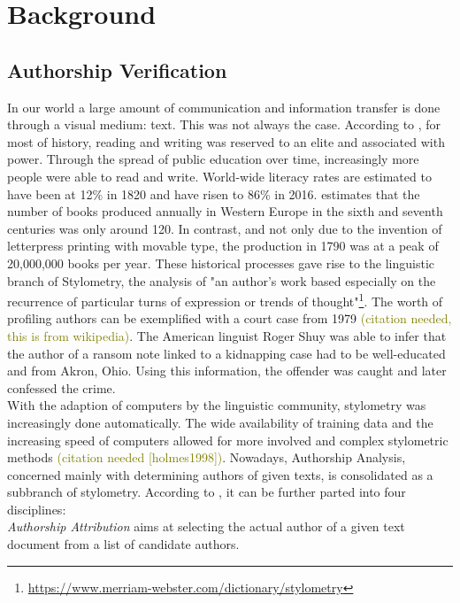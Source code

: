 \chapter{Background}\label{ch:background}
\section{Authorship Verification}\label{sec:authorship-verification}
In our world a large amount of communication and information transfer is done through a visual medium: text.
This was not always the case.
According to \cite{owidliteracy}, for most of history, reading and writing was reserved to an elite and associated with power.
Through the spread of public education over time, increasingly more people were able to read and write.
World-wide literacy rates are estimated to have been at 12\% in 1820 and have risen to 86\% in 2016.
\cite{buringh2009charting} estimates that the number of books produced annually in Western Europe in the sixth and seventh centuries was only around 120.
In contrast, and not only due to the invention of letterpress printing with movable type, the production in 1790 was at a peak of 20,000,000 books per year.
These historical processes gave rise to the linguistic branch of Stylometry, the analysis of "an author's work based especially on the recurrence of particular turns of expression or trends of thought"\footnote{\url{https://www.merriam-webster.com/dictionary/stylometry}}.
The worth of profiling authors can be exemplified with a court case from 1979 \textcolor{olive}{(citation needed, this is from wikipedia)}.
The American linguist Roger Shuy was able to infer that the author of a ransom note linked to a kidnapping case had to be well-educated and from Akron, Ohio.
Using this information, the offender was caught and later confessed the crime.\\
With the adaption of computers by the linguistic community, stylometry was increasingly done automatically.
The wide availability of training data and the increasing speed of computers allowed for more involved and complex stylometric methods \textcolor{olive}{(citation needed [holmes1998])}.
Nowadays, Authorship Analysis, concerned mainly with determining authors of given texts, is consolidated as a subbranch of stylometry.
According to \cite{bevendorff2020shared}, it can be further parted into four disciplines:\\
\textit{Authorship Attribution} aims at selecting the actual author of a given text document from a list of candidate authors.
